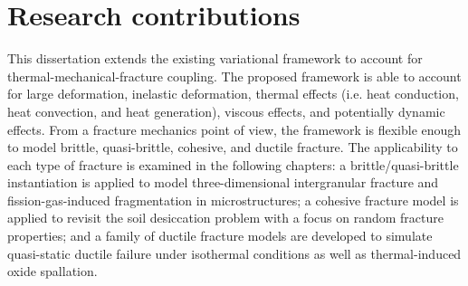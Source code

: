 \section{Research contributions}

This dissertation extends the existing variational framework to account for thermal-mechanical-fracture coupling. The proposed framework is able to account for large deformation, inelastic deformation, thermal effects (i.e. heat conduction, heat convection, and heat generation), viscous effects, and potentially dynamic effects. From a fracture mechanics point of view, the framework is flexible enough to model brittle, quasi-brittle, cohesive, and ductile fracture. The applicability to each type of fracture is examined in the following chapters: a brittle/quasi-brittle instantiation is applied to model three-dimensional intergranular fracture and fission-gas-induced fragmentation in microstructures; a cohesive fracture model is applied to revisit the soil desiccation problem with a focus on random fracture properties; and a family of ductile fracture models are developed to simulate quasi-static ductile failure under isothermal conditions as well as thermal-induced oxide spallation.


